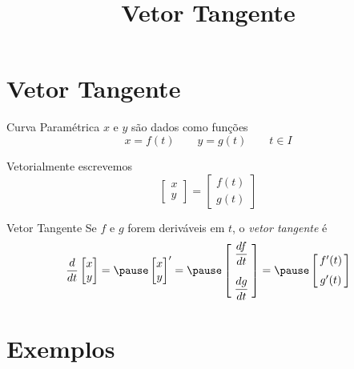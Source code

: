 \documentclass[fleqn,utf8,aspectratio=169,12pt,ignorenonframetext]{beamer}
\title{Vetor Tangente}
\begin{document}
\addtitle

\section{Vetor Tangente}

\begin{frame}{Curva Paramétrica}
  $x$ e $y$ são dados como funções
  \[
    x = f(t)     \qquad
    y = g(t)     \qquad
    t \in I
  \]

  \pause
  Vetorialmente escrevemos
  \[
    \begin{bmatrix}  x    \\ y    \end{bmatrix} =
    \begin{bmatrix}  f(t) \\ g(t) \end{bmatrix}
  \]
\end{frame}

\begin{frame}{Vetor Tangente}
  Se $f$ e $g$ forem deriváveis em $t$, o \emph{vetor tangente} é
  \pause
  \[
    \frac{d}{dt}\begin{bmatrix}  x    \\ y    \end{bmatrix} =
    \pause
    \begin{bmatrix}  x    \\ y    \end{bmatrix}' =
    \pause
    \begin{bmatrix} \;\dfrac{df}{dt}\;\null \\[5mm] \;\dfrac{dg}{dt}\;\null \end{bmatrix} =
    \pause
    \begin{bmatrix} \,f'(t)\,\null \\[2mm] \,g'(t)\,\null \end{bmatrix}
  \]
\end{frame}


\section{Exemplos}
\end{document}
